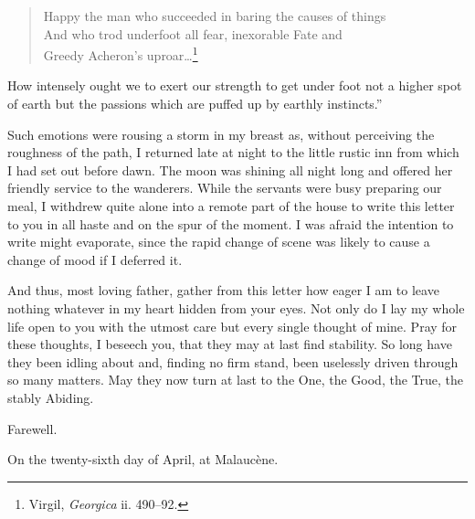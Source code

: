 \begin{verse} Happy the man who succeeded in baring the causes of
things\\ And who trod underfoot all fear, inexorable Fate and\\ Greedy
Acheron's uproar\ldots\footnote{Virgil, \textit{Georgica} ii.
490--92.} \end{verse}

\noindent How intensely ought we to exert our strength to get under
foot not a higher spot of earth but the passions which are puffed up
by earthly instincts.''

Such emotions were rousing a storm in my breast as, without perceiving
the roughness of the path, I returned late at night to the little
rustic inn from which I had set out before dawn. The moon was shining
all night long and offered her friendly service to the wanderers.
While the servants were busy preparing our meal, I withdrew quite
alone into a remote part of the house to write this letter to you in
all haste and on the spur of the moment. I was afraid the intention to
write might evaporate, since the rapid change of scene was likely to
cause a change of mood if I deferred it.

And thus, most loving father, gather from this letter how eager I am
to leave nothing whatever in my heart hidden from your eyes. Not only
do I lay my whole life open to you with the utmost care but every
single thought of mine. Pray for these thoughts, I beseech you, that
they may at last find stability. So long have they been idling about
and, finding no firm stand, been uselessly driven through so many
matters. May they now turn at last to the One, the Good, the True, the
stably Abiding.

Farewell.

On the twenty-sixth day of April, at Malauc\`{e}ne.

